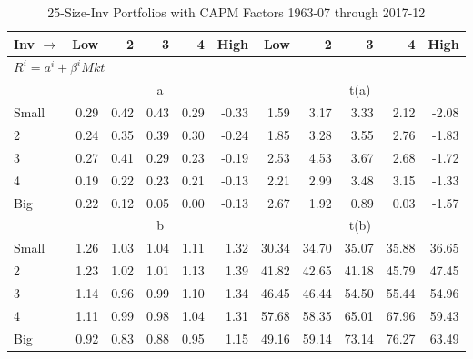 
\begin{table}[!ht]
\footnotesize
\centering
\caption{25-Size-Inv Portfolios with CAPM Factors 1963-07 through 2017-12}
\begin{tabular}{lrrrrrrrrrr}
  \toprule
    Inv $\rightarrow$ & Low & 2 & 3 & 4 & High & Low & 2 & 3 & 4 & High \\ 
  \midrule
  \multicolumn{11}{l}{$R^i=a^i+\beta^iMkt$} \\

  
    
      & \multicolumn{5}{c}{a} & \multicolumn{5}{c}{t(a)}
    
    \\
      \cmidrule(r){2-6} \cmidrule(r){7-11}

    Small   & 0.29  & 0.42  & 0.43  & 0.29  & -0.33  & 1.59  & 3.17  & 3.33  & 2.12  & -2.08  \\
         2  & 0.24  & 0.35  & 0.39  & 0.30  & -0.24  & 1.85  & 3.28  & 3.55  & 2.76  & -1.83  \\
         3  & 0.27  & 0.41  & 0.29  & 0.23  & -0.19  & 2.53  & 4.53  & 3.67  & 2.68  & -1.72  \\
         4  & 0.19  & 0.22  & 0.23  & 0.21  & -0.13  & 2.21  & 2.99  & 3.48  & 3.15  & -1.33  \\
    Big     & 0.22  & 0.12  & 0.05  & 0.00  & -0.13  & 2.67  & 1.92  & 0.89  & 0.03  & -1.57  \\

  
    
      & \multicolumn{5}{c}{b} & \multicolumn{5}{c}{t(b)}
    
    \\
      \cmidrule(r){2-6} \cmidrule(r){7-11}

    Small   & 1.26  & 1.03  & 1.04  & 1.11  & 1.32  & 30.34  & 34.70  & 35.07  & 35.88  & 36.65  \\
         2  & 1.23  & 1.02  & 1.01  & 1.13  & 1.39  & 41.82  & 42.65  & 41.18  & 45.79  & 47.45  \\
         3  & 1.14  & 0.96  & 0.99  & 1.10  & 1.34  & 46.45  & 46.44  & 54.50  & 55.44  & 54.96  \\
         4  & 1.11  & 0.99  & 0.98  & 1.04  & 1.31  & 57.68  & 58.35  & 65.01  & 67.96  & 59.43  \\
    Big     & 0.92  & 0.83  & 0.88  & 0.95  & 1.15  & 49.16  & 59.14  & 73.14  & 76.27  & 63.49  \\

  

  \bottomrule
\end{tabular}
\label{tbl:25_Size_Inv_CAPM}
\end{table}